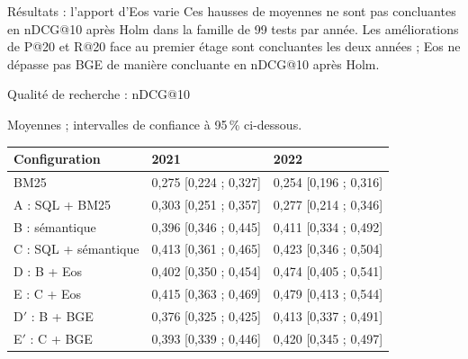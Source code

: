 \documentclass[final]{beamer}
\newlength{\colwidth}
\begin{document}
\begin{frame}[t]
\begin{columns}[t]
\begin{column}{\colwidth}
\begin{alertblock}{Résultats : l'apport d'Eos varie}
Ces hausses de moyennes ne sont pas concluantes en nDCG@10 après Holm dans la famille de 99 tests par année. Les améliorations de P@20 et R@20 face au premier étage sont concluantes les deux années ; Eos ne dépasse pas BGE de manière concluante en nDCG@10 après Holm.
\end{alertblock}
\begin{block}{Qualité de recherche : nDCG@10}
\begin{center}
\end{center}
{\small Moyennes ; intervalles de confiance à 95\,\% ci-dessous.}

{\small\begin{tabular*}{\linewidth}{@{\extracolsep{\fill}}lll@{}}
\toprule
Configuration & 2021 & 2022 \\
\midrule
BM25 & 0,275 [0,224 ; 0,327] & 0,254 [0,196 ; 0,316] \\
A : SQL + BM25 & 0,303 [0,251 ; 0,357] & 0,277 [0,214 ; 0,346] \\
B : sémantique & 0,396 [0,346 ; 0,445] & 0,411 [0,334 ; 0,492] \\
C : SQL + sémantique & 0,413 [0,361 ; 0,465] & 0,423 [0,346 ; 0,504] \\
D : B + Eos & 0,402 [0,350 ; 0,454] & 0,474 [0,405 ; 0,541] \\
E : C + Eos & 0,415 [0,363 ; 0,469] & 0,479 [0,413 ; 0,544] \\
D$'$ : B + BGE & 0,376 [0,325 ; 0,425] & 0,413 [0,337 ; 0,491] \\
E$'$ : C + BGE & 0,393 [0,339 ; 0,446] & 0,420 [0,345 ; 0,497] \\
\bottomrule
\end{tabular*}}



\end{block}
\end{column}
\end{columns}
\end{frame}
\end{document}
